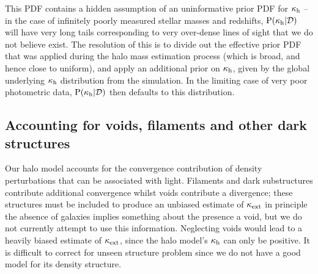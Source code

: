 \documentclass[useAMS,usenatbib,a4paper]{mn2e}
\begin{document}
This PDF contains a hidden assumption of an uninformative prior PDF for
$\kappa_{\rm h}$ -- in the case of infinitely poorly measured stellar masses and
redshifts, ${\rm P}(\kappa_{\rm h}|{\mathcal{D}})$ will have very long tails corresponding to
very over-dense lines of sight that we do not believe exist. The resolution of this
is to divide out the effective prior PDF that was applied during the halo mass
estimation process (which is broad, and hence close to uniform), and apply an
additional prior on $\kappa_{\rm h}$, given by the global underlying $\kappa_{\rm h}$
distribution from the simulation. In the limiting  case of very poor
photometric data, ${\rm P}(\kappa_{\rm h}|{\mathcal{D}})$ then defaults to this distribution.





\subsection{Accounting for voids, filaments and other dark structures}
\label{sec:model:voids}

Our halo model accounts for the convergence contribution of density perturbations that can
be associated with light. Filaments and dark substructures contribute additional convergence
whilst voids contribute a divergence; these structures must be included to produce an unbiased estimate of $\kappa_{\rm ext}$
in principle the absence of galaxies implies something about
the presence a void, but we do not currently attempt to use this information. Neglecting voids
would lead to a heavily biased estimate of $\kappa_{\rm ext}$, since the halo model's $\kappa_{\rm h}$
can only be positive. It is difficult to correct for unseen structure problem
since we do not have a good model for its density structure.
\end{document}
